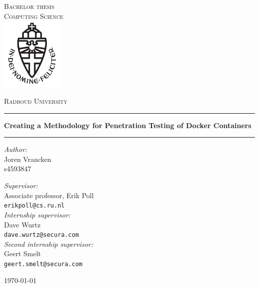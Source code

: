 \documentclass[11pt,a4paper]{report}
\begin{document}
    \hypersetup{pageanchor=false}
    \begin{titlepage}
        \begin{center}
            \textsc{\LARGE Bachelor thesis\\Computing Science}\\[1.5cm]
            \includegraphics[height=100pt]{resources/images/logo}

            \vspace{0.4cm}
            \textsc{\Large Radboud University}\\[1cm]
            \hrule
            \vspace{0.4cm}
            \textbf{\huge Creating a Methodology for Penetration Testing of Docker Containers}\\[0.4cm]
            \hrule
            \vspace{2cm}
            \begin{minipage}[t]{0.45\textwidth}
                \begin{flushleft} \large
                    \textit{Author:}\\
                    Joren Vrancken\\
                    s4593847
                \end{flushleft}
            \end{minipage}
            \begin{minipage}[t]{0.45\textwidth}
                \begin{flushright} \large
                    \textit{Supervisor:}\\
                    Associate professor, Erik Poll\\
                    \texttt{erikpoll@cs.ru.nl}\\[1.3cm]
                    \textit{Internship supervisor:}\\
                    Dave Wurtz\\
                    \texttt{dave.wurtz@secura.com}\\[1.3cm]
                    \textit{Second internship supervisor:}\\
                    Geert Smelt\\
                    \texttt{geert.smelt@secura.com}
                \end{flushright}
            \end{minipage}

            \vfill {\large \today}
            \hfill

        \end{center}
    \end{titlepage}
\end{document}
